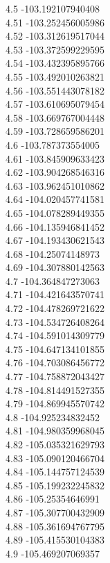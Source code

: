 {4.5	-103.192107940408\\
4.51	-103.252456005986\\
4.52	-103.312619517044\\
4.53	-103.372599229595\\
4.54	-103.432395895766\\
4.55	-103.492010263821\\
4.56	-103.551443078182\\
4.57	-103.610695079454\\
4.58	-103.669767004448\\
4.59	-103.728659586201\\
4.6	-103.787373554005\\
4.61	-103.845909633423\\
4.62	-103.904268546316\\
4.63	-103.962451010862\\
4.64	-104.020457741581\\
4.65	-104.078289449355\\
4.66	-104.135946841452\\
4.67	-104.193430621543\\
4.68	-104.25074148973\\
4.69	-104.307880142563\\
4.7	-104.364847273063\\
4.71	-104.421643570741\\
4.72	-104.478269721622\\
4.73	-104.534726408264\\
4.74	-104.591014309779\\
4.75	-104.647134101855\\
4.76	-104.703086456772\\
4.77	-104.758872043427\\
4.78	-104.814491527355\\
4.79	-104.869945570742\\
4.8	-104.925234832452\\
4.81	-104.980359968045\\
4.82	-105.035321629793\\
4.83	-105.090120466704\\
4.84	-105.144757124539\\
4.85	-105.199232245832\\
4.86	-105.25354646991\\
4.87	-105.307700432909\\
4.88	-105.361694767795\\
4.89	-105.415530104383\\
4.9	-105.469207069357\\
}
